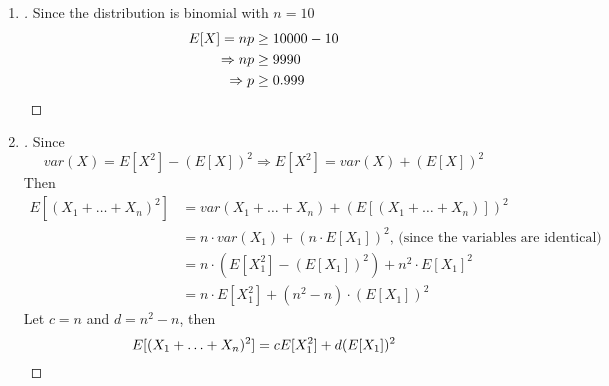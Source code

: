 \documentclass[paper=usletter, fontsize=12pt]{article}
\begin{document}
\begin{enumerate}
\begin{proof}[\unskip\nopunct]
\begin{enumerate}
            \end{enumerate}
        \end{proof}
        \vspace{0.2in}

        \item
        \begin{proof}[\unskip\nopunct]
            Since the distribution is binomial with $n=10$
            \begin{align*}
                E[X] = np & \ge 10000-10\\
                \Rightarrow np & \ge 9990\\
                \Rightarrow p & \ge 0.999 \qedhere
            \end{align*}
        \end{proof}
        \vspace{0.2in}

        \item
        \begin{proof}[\unskip\nopunct]
            Since
            \begin{equation*}
                var(X) = E[X^2] - (E[X])^2 \Rightarrow E[X^2] = var(X) + (E[X])^2
            \end{equation*}
            Then
            \begin{align*}
                E[(X_1 + \ldots + X_n)^2] & = var(X_1 + \ldots + X_n) + (E[(X_1 + \ldots + X_n)])^2\\
                & = n \cdot var(X_1) + (n \cdot E[X_1])^2 \text{, (since the variables are identical)}\\
                & = n \cdot (E[X_1^2] - (E[X_1])^2) + n^2 \cdot E[X_1]^2\\
                & = n \cdot E[X_1^2] + (n^2-n) \cdot (E[X_1])^2
            \end{align*}
            Let $c = n$ and $d = n^2-n$, then
            \begin{equation*}
                E[(X_1 + \ldots + X_n)^2] = cE[X_1^2] + d(E[X_1])^2 \qedhere
            \end{equation*}
        \end{proof}
        \vspace{0.2in}

    \end{enumerate}
\end{document}

